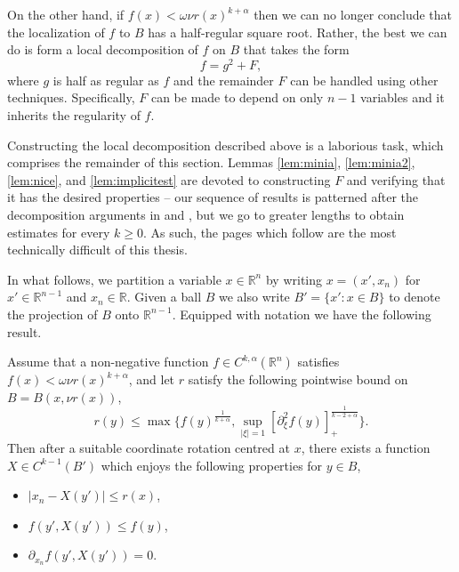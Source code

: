 \documentclass[oneside,hidelinks,indentfirst,10pt]{book}
\begin{document}
On the other hand, if \(f(x)<\omega\nu r(x)^{k+\alpha}\) then we can no longer conclude that the localization of \(f\) to \(B\) has a half-regular square root. Rather, the best we can do is form a local decomposition of \(f\) on \(B\) that takes the form
\begin{equation}\label{eq:loooooocal}
    f=g^2+F,
\end{equation}
where \(g\) is half as regular as \(f\) and the remainder \(F\) can be handled using other techniques. Specifically, \(F\) can be made to depend on only \(n-1\) variables and it inherits the regularity of \(f\).


Constructing the local decomposition described above is a laborious task, which comprises the remainder of this section. Lemmas \ref{lem:minia}, \ref{lem:minia2}, \ref{lem:nice}, and \ref{lem:implicitest} are devoted to constructing \(F\) and verifying that it has the desired properties -- our sequence of results is patterned after the decomposition arguments in \cite{Tataru} and \cite{SOS_I}, but we go to greater lengths to obtain estimates for every \(k\geq 0\). As such, the pages which follow are the most technically difficult of this thesis.


In what follows, we partition a variable \(x\in\mathbb{R}^n\) by writing \(x=(x',x_n)\) for \(x'\in\mathbb{R}^{n-1}\) and \(x_n\in\mathbb{R}\). Given a ball \(B\) we also write \(B'=\{x':x\in B\}\) to denote the projection of \(B\) onto \(\mathbb{R}^{n-1}\). Equipped with notation we have the following result.


\begin{lem}\label{lem:minia}
Assume that a non-negative function \(f\in C^{k,\alpha}(\mathbb{R}^n)\) satisfies \(f(x)<\omega \nu r(x)^{k+\alpha}\), and let \(r\) satisfy the following pointwise bound on \(B=B(x,\nu r(x))\),
\vspace{-0.25em}
\begin{equation}\label{eq:needed}
    r(y)\leq \max\bigg\{f(y)^\frac{1}{k+\alpha},\sup_{|\xi|=1}[\partial^2_\xi f(y)]_+^\frac{1}{k-2+\alpha}\bigg\}.
\end{equation}
Then after a suitable coordinate rotation centred at \(x\), there exists a function \(X\in C^{k-1}(B')\) which enjoys the following properties for \(y\in B\),
\begin{itemize}
    \item[(1)] \(|x_n-X(y')|\leq r(x)\),
    \item[(2)] \(f(y',X(y'))\leq f(y)\),
    \item[(3)] \(\partial_{x_n}f(y',X(y'))=0\).
\end{itemize}
\end{lem}
\end{document}
